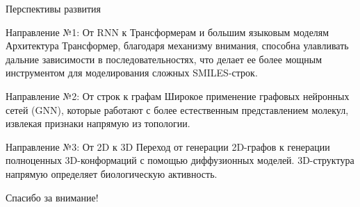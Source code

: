 \documentclass{beamer}
\begin{document}
\begin{frame}{Перспективы развития}
    \begin{block}{Направление №1: От RNN к Трансформерам и большим языковым моделям}
    Архитектура Трансформер, благодаря механизму внимания, способна улавливать дальние зависимости в последовательностях, что делает ее более мощным инструментом для моделирования сложных SMILES-строк.
    \end{block}

    \begin{block}{Направление №2: От строк к графам}
    Широкое применение графовых нейронных сетей (GNN), которые работают с более естественным представлением молекул, извлекая признаки напрямую из топологии.
    \end{block}
    
    \begin{block}{Направление №3: От 2D к 3D}
    Переход от генерации 2D-графов к генерации полноценных 3D-конформаций с помощью диффузионных моделей. 3D-структура напрямую определяет биологическую активность.
    \end{block}
\end{frame}

\begin{frame}
    \centering
    \Huge
    Спасибо за внимание!
\end{frame}
\end{document}
